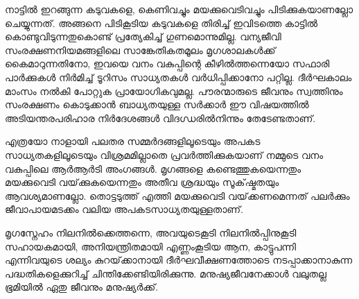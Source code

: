 \documentclass[
    11pt,
    a4paper
]{article}
\begin{document}
നാട്ടിൽ ഇറങ്ങുന്ന കടുവകളെ, കെണിവച്ചും മയക്കുവെടിവച്ചും പിടിക്കുകയാണല്ലോ ചെയ്യുന്നത്. അങ്ങനെ പിടികൂടിയ കടുവകളെ തിരിച്ച് ഇവിടത്തെ കാട്ടിൽ കൊണ്ടുവിടുന്നതുകൊണ്ട് പ്രത്യേകിച്ച് ഗുണമൊന്നുമില്ല.  വന്യജീവി സംരക്ഷണനിയമങ്ങളിലെ സാങ്കേതികതമൂലം  മൃഗശാലകൾക്ക് കൈമാറുന്നതിനോ, ഇവയെ വനം വകുപ്പിന്റെ കീഴിൽത്തന്നെയോ സഫാരി പാർക്കുകൾ നിർമിച്ച്  ടൂറിസം സാധ്യതകൾ വർധിപ്പിക്കാനോ പറ്റില്ല. ദീർഘകാലം മാംസം നൽകി  പോറ്റുക പ്രായോഗികവുമല്ല. പൗരന്മാരുടെ  ജീവനും സ്വത്തിനും സംരക്ഷണം കൊടുക്കാൻ ബാധ്യതയുള്ള സർക്കാർ ഈ വിഷയത്തിൽ അടിയന്തരപരിഹാര നിർദേശങ്ങൾ വിദഗ്ധരിൽനിന്നും തേടേണ്ടതാണ്.

എത്രയോ നാളായി പലതര സമ്മർദങ്ങളിലൂടെയും അപകട സാധ്യതകളിലൂടെയും വിശ്രമമില്ലാതെ പ്രവർത്തിക്കുകയാണ് നമ്മുടെ  വനം വകുപ്പിലെ ആർആർടി അംഗങ്ങൾ.  മൃഗങ്ങളെ കണ്ടെത്തുകയെന്നതും മയക്കുവെടി വയ്‌ക്കുകയെന്നതും  അതീവ ശ്രദ്ധയും  സൂക്‌ഷ്മതയും ആവശ്യമാണല്ലോ. തൊട്ടടുത്ത് എത്തി മയക്കുവെടി വയ്‌ക്കണമെന്നത് പലർക്കും ജീവാപായമടക്കം  വലിയ അപകടസാധ്യതയുള്ളതാണ്.

മൃഗസ്നേഹം നിലനിൽക്കെത്തന്നെ, അവയുടെകൂടി നിലനിൽപ്പിനുകൂടി സഹായകമായി, അനിയന്ത്രിതമായി എണ്ണംകൂടിയ ആന, കാട്ടുപന്നി എന്നിവയുടെ ശല്യം കുറയ്‌ക്കാനായി ദീർഘവീക്ഷണത്തോടെ നടപ്പാക്കാനാകുന്ന പദ്ധതികളെക്കുറിച്ച് ചിന്തിക്കേണ്ടിയിരിക്കുന്നു. മനുഷ്യജീവനേക്കാൾ വലുതല്ല ഭൂമിയിൽ ഏതു ജീവനും മനുഷ്യർക്ക്.
\end{document}

